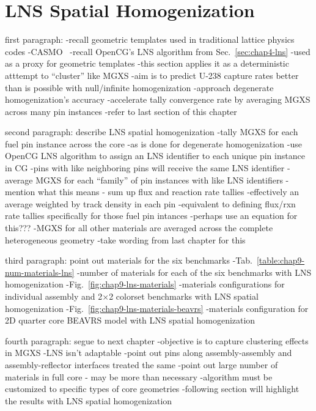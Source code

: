 \section{LNS Spatial Homogenization}
\label{sec:chap9-lns-homogenize}

first paragraph: 
-recall geometric templates used in traditional lattice physics codes
  -CASMO~\cite{rhodes2006casmo}
-recall OpenCG's \ac{LNS} algorithm from Sec.~\ref{sec:chap4-lns}
  -used as a proxy for geometric templates
-this section applies it as a deterministic atttempt to ``cluster'' like \ac{MGXS}
-aim is to predict U-238 capture rates better than is possible with null/infinite homogenization
  -approach degenerate homogenization's accuracy
  -accelerate tally convergence rate by averaging \ac{MGXS} across many pin instances
    -refer to last section of this chapter

second paragraph: describe \ac{LNS} spatial homogenization
-tally \ac{MGXS} for each fuel pin instance across the core
  -as is done for degenerate homogenization
-use OpenCG \ac{LNS} algorithm to assign an \ac{LNS} identifier to each unique pin instance in \ac{CG}
  -pins with like neighboring pins will receive the same \ac{LNS} identifier
-average \ac{MGXS} for each ``family'' of pin instances with like \ac{LNS} identifiers
  -mention what this means - sum up flux and reaction rate tallies
    -effectively an average weighted by track density in each pin
    -equivalent to defining flux/rxn rate tallies specifically for those fuel pin intances
    -perhaps use an equation for this???
-\ac{MGXS} for all other materials are averaged across the complete heterogeneous geometry
  -take wording from last chapter for this

third paragraph: point out materials for the six benchmarks
-Tab.~\ref{table:chap9-num-materials-lns} 
  -number of materials for each of the six benchmarks with \ac{LNS} homogenization
-Fig.~\ref{fig:chap9-lns-materials}
  -materials configurations for individual assembly and 2$\times$2 colorset benchmarks with \ac{LNS} spatial homogenization
-Fig.~\ref{fig:chap9-lns-materials-beavrs}
  -materials configuration for 2D quarter core \ac{BEAVRS} model with \ac{LNS} spatial homogenization

fourth paragraph: segue to next chapter
-objective is to capture clustering effects in MGXS
-LNS isn't adaptable
  -point out pins along assembly-assembly and assembly-reflector interfaces treated the same
  -point out large number of materials in full core - may be more than necessary
  -algorithm must be customized to specific types of core geometries
-following section will highlight the results with \ac{LNS} spatial homogenization

